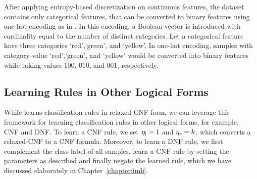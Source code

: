 After applying entropy-based discretization on continuous features,  the dataset  contains only categorical features, that can be converted to binary features using one-hot encoding as in \cite{lakkaraju2019faithful}. In this encoding, a Boolean vector is introduced with cardinality equal to the number of distinct categories. Let a categorical feature have three  categories `red',`green', and `yellow'. In one-hot encoding, samples with category-value `red',`green', and `yellow' would be converted into binary features while taking values $ 100 $, $ 010 $, and $ 001 $, respectively. 


\subsection{Learning Rules in Other Logical Forms}
\label{interpretability_crr_sec:other_rules}
While {\crr} learns  classification rules in relaxed-CNF form, we can leverage this framework for learning classification rules in other logical forms, for example, CNF and  DNF. To learn a CNF rule, we set  $ \eta_l=1 $ and $ \eta_c=k $, which converts a relaxed-CNF to a CNF formula. Moreover,  to learn a DNF rule,  we first complement the class label of all samples, learn a CNF rule by setting the parameters as described and finally negate the learned rule, which we have discussed elaborately in Chapter~\ref{chapter:imli}.





